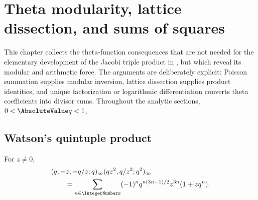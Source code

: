 \chapter{Theta modularity, lattice dissection, and sums of squares}
\label{chap:theta-modularity-squares}

This chapter collects the theta-function consequences that are not needed for
the elementary development of the Jacobi triple product in
, but which reveal its modular and arithmetic force.  The
arguments are deliberately explicit: Poisson summation supplies modular
inversion, lattice dissection supplies product identities, and unique
factorization or logarithmic differentiation converts theta coefficients into
divisor sums.  Throughout the analytic sections, $0<\AbsoluteValue q<1$.

\section{Watson's quintuple product}

\begin{theorem}
\label{qg:thm-quintuple-product}
For $z\ne0$,
\begin{align}
 &(q,-z,-q/z;q)_\infty(qz^2,q/z^2;q^2)_\infty\notag\\
 &\qquad=\sum_{n\in\IntegerNumbers}(-1)^n
 q^{n(3n-1)/2}z^{3n}(1+zq^n).
\label{eq:qg-quintuple-product}
\end{align}
\end{theorem}

